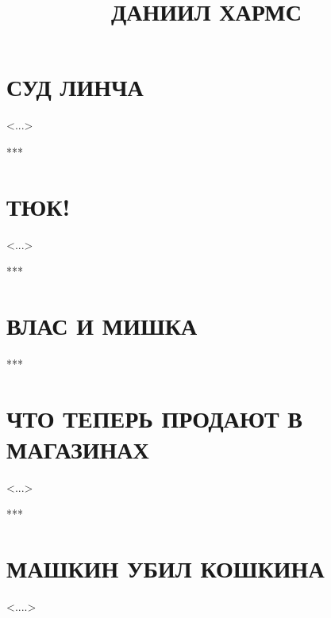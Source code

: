 \documentclass[12pt,a4paper]{book}
\title{ДАНИИЛ ХАРМС}
\author{}
\date{}
\begin{document}
\maketitle

\chapter*{\centering СУД ЛИНЧА}

\hfill <...>
\begin{center}
***
\end{center}

\chapter*{\centering ТЮК!}


\hfill <...>
\begin{center}
***
\end{center}

\chapter*{\centering ВЛАС И МИШКА}

\begin{center}
\begin{minipage}{0.5\textwidth}

\end{minipage}
\end{center}
\begin{center}
***
\end{center}

\chapter*{\centering ЧТО ТЕПЕРЬ ПРОДАЮТ В МАГАЗИНАХ}

\hfill <...>
\begin{center}
***
\end{center}

\chapter*{\centering МАШКИН УБИЛ КОШКИНА}

\hfill <....>
\end{document}
